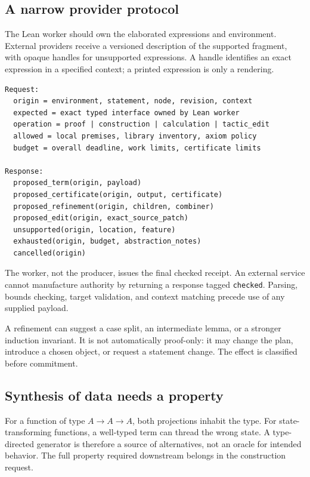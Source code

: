 \documentclass[11pt,a4paper]{article}
\newcommand{\code}[1]{\nolinkurl{#1}}
\theoremstyle{definition}
\begin{document}
\subsection{A narrow provider protocol}
The Lean worker should own the elaborated expressions and environment. External
providers receive a versioned description of the supported fragment, with opaque
handles for unsupported expressions. A handle identifies an exact expression
in a specified context; a printed expression is only a rendering.
\par\noindent\begin{minipage}{\linewidth}
\begin{lstlisting}
Request:
  origin = environment, statement, node, revision, context
  expected = exact typed interface owned by Lean worker
  operation = proof | construction | calculation | tactic_edit
  allowed = local premises, library inventory, axiom policy
  budget = overall deadline, work limits, certificate limits

Response:
  proposed_term(origin, payload)
  proposed_certificate(origin, output, certificate)
  proposed_refinement(origin, children, combiner)
  proposed_edit(origin, exact_source_patch)
  unsupported(origin, location, feature)
  exhausted(origin, budget, abstraction_notes)
  cancelled(origin)
\end{lstlisting}
\end{minipage}\par
The worker, not the producer, issues the final checked receipt. An external
service cannot manufacture authority by returning a response tagged
\code{checked}. Parsing, bounds checking, target validation, and context matching
precede use of any supplied payload.

A refinement can suggest a case split, an intermediate lemma, or a stronger
induction invariant. It is not automatically proof-only: it may change the
plan, introduce a chosen object, or request a statement change. The effect is
classified before commitment.

\subsection{Synthesis of data needs a property}
For a function of type $A\to A\to A$, both projections inhabit the type. For
state-transforming functions, a well-typed term can thread the wrong state.
A type-directed generator is therefore a source of alternatives, not an oracle
for intended behavior. The full property required downstream belongs in the
construction request.
\end{document}
